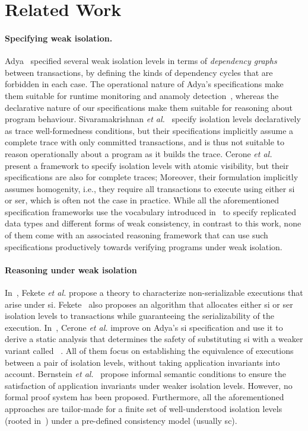 \section{Related Work}
\label{sec:relatedwork}

\paragraph{Specifying weak isolation.}
Adya~\cite{adyaphd} specified several weak isolation levels in terms
of \emph{dependency graphs} between transactions, by defining the
kinds of dependency cycles that are forbidden in each case. The
operational nature of Adya's specifications make them suitable for
runtime monitoring and anamoly
detection~\cite{kemmevldb,feketesigmod08,pssi2011}, whereas the
declarative nature of our specifications make them suitable for
reasoning about program behaviour. Sivaramakrishnan \emph{et
  al.}~\cite{pldi15} specify isolation levels declaratively as trace
well-formedness conditions, but their specifications implicitly assume
a complete trace with only committed transactions, and is thus not
suitable to reason operationally about a program as it builds the
trace. Cerone \emph{et al.}~\cite{gotsmanconcur15} present a framework
to specify isolation levels with atomic visibility, but their
specifications are also for complete traces; Moreover, their
formulation implicitly assumes homogenity, i.e., they require all
transactions to execute using either {\sc si} or {\sc ser}, which is
often not the case in practice. While all the aforementioned
specification frameworks use the vocabulary introduced
in~\cite{burckhardt14} to specify replicated data types and different
forms of weak consistency, in contrast to this work, none of them come
with an associated reasoning framework that can use such
specifications productively towards verifying programs under weak
isolation.

\paragraph{Reasoning under weak isolation} In~\cite{feketessi}, Fekete
\emph{et al.} propose a theory to characterize non-serializable executions
that arise under {\sc si}. Fekete~\cite{fekete2005} also proposes an
algorithm that allocates either {\sc si} or {\sc ser} isolation levels
to transactions while guaranteeing the serializability of the
execution. In~\cite{gotsmanpodc16}, Cerone \emph{et al.} improve on Adya's
{\sc si} specification and use it to derive a static analysis that
determines the safety of substituting {\sc si} with a weaker variant
called ~\cite{psi}. All of them focus
on establishing the equivalence of executions between a pair of
isolation levels, without taking application invariants into account.
Bernstein \emph{et al.}~\cite{bern2000} propose informal semantic conditions
to ensure the satisfaction of application invariants under weaker
isolation levels.  However, no formal proof system has been proposed.
Furthermore, all the aforementioned approaches are tailor-made for a
finite set of well-understood isolation levels (rooted
in~\cite{berenson}) under a pre-defined consistency model (usually
{\sc sc}). 


